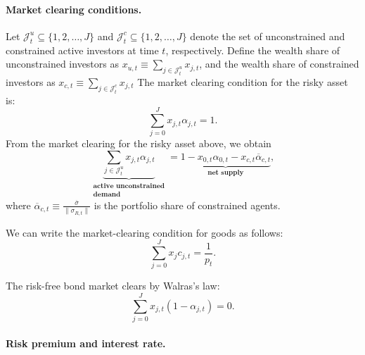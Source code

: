 \documentclass[12pt,english]{article}
\begin{document}
\paragraph{Market clearing conditions.} 
Let $\mathcal{J}_t^u \subseteq \{1,2,\ldots, J\}$ and $\mathcal{J}_t^c \subseteq \{1,2,\ldots, J\}$ denote the set of unconstrained and constrained active investors at time $t$, respectively.
Define the wealth share of unconstrained investors as $x_{u,t} \equiv \sum_{j\in \mathcal{J}_t^u} x_{j,t}$, and the wealth share of constrained investors as  $x_{c,t} \equiv \sum_{j\in \mathcal{J}_t^c} x_{j,t}$
The market clearing condition for the risky asset is:
\begin{equation}\label{eq:risky-asset-mc2}
	\sum_{j=0}^Jx_{j,t}\alpha_{j,t}=1.
\end{equation}
From the market clearing for the risky asset above, we obtain
\begin{equation}\label{eq:risky-asset-mc}
	\underbrace{\sum_{j \in \mathcal{J}_t^u} x_{j,t} \alpha_{j,t} }_{\substack{\textbf{active unconstrained}\\
			\textbf{demand}}} = \underbrace{1 - x_{0,t} \alpha_{0,t} - x_{c,t} \overline{\alpha}_{c,t} }_{\textbf{net supply}},
\end{equation}
where $\overline{\alpha}_{c,t} \equiv\frac{\overline{\sigma}}{\|\sigma_{R,t}\|}$ is the portfolio share of constrained agents. 

We can write the market-clearing condition for goods as follows:
\begin{equation}\label{eq:goods-mc}
	\sum_{j=0}^J x_j c_{j,t} = \frac{1}{p_t}.
\end{equation}

The risk-free bond market clears by Walras's law:
\begin{equation}\label{eq:risk-free-mc}
	\sum_{j=0}^Jx_{j,t}(1-\alpha_{j,t})=0.
\end{equation}

\paragraph{Risk premium and interest rate.} 
\end{document}
